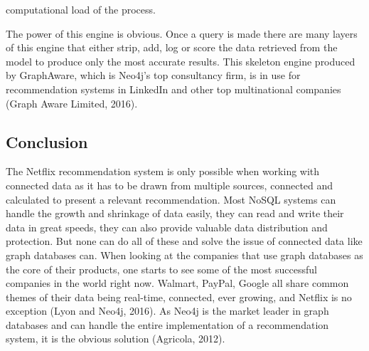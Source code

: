 \documentclass[a4paper]{article}
\begin{document}
computational load of the process.

The power of this engine is obvious. Once a query is made there are many layers of this engine that either strip, add, log or score the data retrieved from the model to produce only the most accurate results. This skeleton engine produced by GraphAware, which is Neo4j's top consultancy firm, is in use for recommendation systems in LinkedIn and other top multinational companies (Graph Aware Limited, 2016).

\subsection{Conclusion}

The Netflix recommendation system is only possible when working with connected data as it has to be drawn from multiple sources, connected and calculated to present a relevant recommendation. Most NoSQL systems can handle the growth and shrinkage of data easily, they can read and write their data in great speeds, they can also provide valuable data distribution and protection. But none can do all of these and solve the issue of connected data like graph databases can. When looking at the companies that use graph databases as the core of their products, one starts to see some of the most successful companies in the world right now. Walmart, PayPal, Google all share common themes of their data being real-time, connected, ever growing, and Netflix is no exception (Lyon and Neo4j, 2016). As Neo4j is the market leader in graph databases and can handle the entire implementation of a recommendation system, it is the obvious solution (Agricola, 2012). \par
\end{document}
